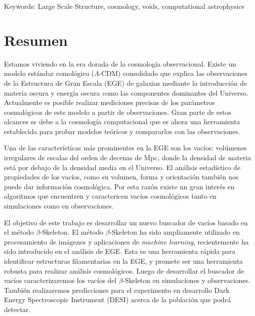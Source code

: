 \documentclass[preprint]{aastex62}
\begin{document}
  \medskip

  Keywords: Large Scale Structure, cosmology, voids, computational astrophysics


  \fi


  \section{Resumen}
  Estamos viviendo en la era dorada de la cosmolog\'ia observacional.
  Existe un modelo est\'andar comol\'ogico ($\Lambda$-CDM) consolidado 
  que explica las observaciones de la Estructura de Gran Escala (EGE) de galaxias mediante
  la introducci\'on de materia oscura y energ\'ia oscura como las componentes
  dominantes del Universo.
  Actualmente es posible realizar mediciones precisas de los
  par\'ametros cosmol\'ogicos de este modelo a partir de observaciones. 
  Gran parte de estos alcances se debe a la cosmolog\'ia computacional
  que es ahora una herramienta establecida para probar modelos te\'oricos y
  compararlos con las observaciones. 

  Una de las caracter\'isticas m\'as prominentes en la EGE son los vac\'ios: vol\'umenes
  irregulares de escalas del orden de decenas de Mpc, donde la densidad de materia est\'a
  por debajo de la densidad media en el Universo. El an\'alisis estad\'istico de propiedades
  de los vac\'ios, como su volumen, forma y orientaci\'on tambi\'en nos puede dar informaci\'on
  cosmol\'ogica. Por esta raz\'on existe un gran inter\'es en algoritmos que encuentren y
  caractericen vac\'ios cosmol\'ogicos tanto en simulaciones como en observaciones.

  El objetivo de este trabajo es desarrollar un nuevo buscador de vac\'ios basado en el
  m\'etodo $\beta$-Skeleton. El m\'etodo $\beta$-Skeleton ha sido ampliamente utilizado
  en procesamiento de im\'agenes y aplicaciones de \textit{machine learning},
  recientemente ha sido introducido en el an\'alisis de EGE. Esta es una herramienta r\'apida
  para identificar estructuras filamentarias en la EGE, y promete ser una herramienta robusta
  para realizar an\'alisis cosmol\'ogicos. Luego de desarrollar el buscador de vac\'ios
  caracterizaremos los vac\'ios del $\beta$-Skeleton en simulaciones y observaciones. Tambi\'en
  realizaremos predicciones para el experimento en desarrollo Dark Energy Spectroscopic
  Instrument (DESI) acerca de la poblaci\'on que podr\'a detectar.
\end{document}
